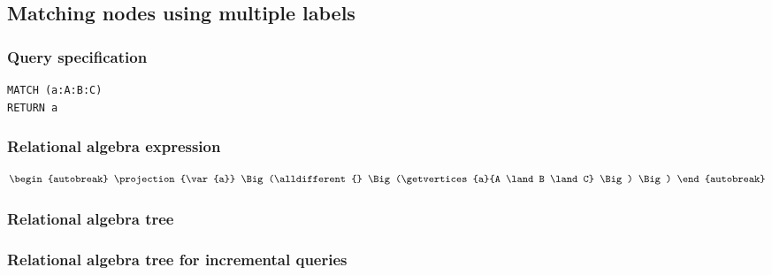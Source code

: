 \subsection{Matching nodes using multiple labels}

\subsubsection*{Query specification}

\begin{lstlisting}
MATCH (a:A:B:C)
RETURN a
\end{lstlisting}

\subsubsection*{Relational algebra expression}

\begin{align*}
\begin{autobreak}
\projection{\var{a}} \Big(\alldifferent{} \Big(\getvertices{a}{A \land B \land C}
\Big)
\Big)
\end{autobreak}
\end{align*}

\subsubsection*{Relational algebra tree}


\subsubsection*{Relational algebra tree for incremental queries}


